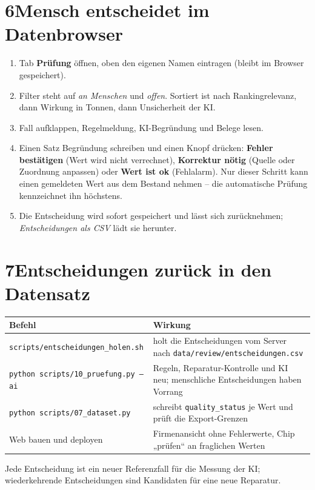 \documentclass[11pt,a4paper]{article}
\begin{document}
\section*{6\quad Mensch entscheidet im Datenbrowser}
\begin{enumerate}
\item Tab \textbf{Prüfung} öffnen, oben den eigenen Namen eintragen (bleibt im Browser gespeichert).
\item Filter steht auf \emph{an Menschen} und \emph{offen}. Sortiert ist nach Rankingrelevanz, dann Wirkung in Tonnen, dann Unsicherheit der KI.
\item Fall aufklappen, Regelmeldung, KI-Begründung und Belege lesen.
\item Einen Satz Begründung schreiben und einen Knopf drücken: \textbf{Fehler bestätigen} (Wert wird nicht verrechnet), \textbf{Korrektur nötig} (Quelle oder Zuordnung anpassen) oder \textbf{Wert ist ok} (Fehlalarm). Nur dieser Schritt kann einen gemeldeten Wert aus dem Bestand nehmen -- die automatische Prüfung kennzeichnet ihn höchstens.
\item Die Entscheidung wird sofort gespeichert und lässt sich zurücknehmen; \emph{Entscheidungen als CSV} lädt sie herunter.
\end{enumerate}

\section*{7\quad Entscheidungen zurück in den Datensatz}
\begin{center}\small
\begin{tabularx}{\textwidth}{P{6.2cm} X}
\toprule
\textbf{Befehl} & \textbf{Wirkung} \\
\midrule
\texttt{scripts/entscheidungen\_holen.sh} & holt die Entscheidungen vom Server nach \texttt{data/review/entscheidungen.csv} \\
\texttt{python scripts/10\_pruefung.py --ai} & Regeln, Reparatur-Kontrolle und KI neu; menschliche Entscheidungen haben Vorrang \\
\texttt{python scripts/07\_dataset.py} & schreibt \texttt{quality\_status} je Wert und prüft die Export-Grenzen \\
Web bauen und deployen & Firmenansicht ohne Fehlerwerte, Chip „prüfen“ an fraglichen Werten \\
\bottomrule
\end{tabularx}
\end{center}
Jede Entscheidung ist ein neuer Referenzfall für die Messung der KI; wiederkehrende Entscheidungen sind Kandidaten für eine neue Reparatur.
\end{document}
